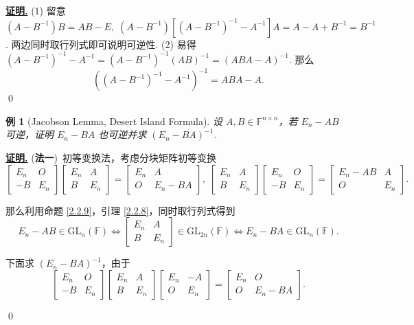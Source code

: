 \documentclass[10pt,openany]{article}
\theoremstyle{thmstyle} %
\theoremstyle{defstyle} %
\theoremstyle{prostyle} %
\theoremstyle{exastyle}
\newtheorem{example}[theorem]{例}
\theoremstyle{remstyle}
\renewenvironment{proof}[1][证明]{\par\underline{\textbf{#1.}} \;\fangsong}{\qed\par}
\newcommand{\F}{\mathbb{F}}
\newcommand{\gfn}{\text{GL}_n(\mathbb{F})}
\newcommand{\n}{^{n \times n}}
\begin{document}
\begin{proof}
	(1) 留意 \( (A-B^{-1})B=AB-E, \; (A-B^{-1})[(A - B^{-1})^{-1} - A^{-1}]A=A-A+B^{-1}=B^{-1} \). 两边同时取行列式即可说明可逆性. (2) 易得 \( (A - B^{-1})^{-1} - A^{-1}=(A - B^{-1})^{-1}(AB)^{-1}=(ABA-A)^{-1} \). 那么
	\[ \left( (A - B^{-1})^{-1} - A^{-1} \right)^{-1}=ABA-A. \]
\end{proof}

\begin{example}[Jacobson Lemma, Desert Island Formula] \label{2.5.11}
	设 \( A,B \in \F\n \)，若 \( E_n-AB \) 可逆，证明 \( E_n-BA \) 也可逆并求 \( (E_n-BA)^{-1} \).
\end{example}

\begin{proof}
	(\textbf{法一})\ 初等变换法，考虑分块矩阵初等变换
	\[ \begin{bmatrix}
		E_n & O \\
		-B & E_n
	\end{bmatrix}\begin{bmatrix}
	E_n & A \\
	B & E_n
	\end{bmatrix}=\begin{bmatrix}
	E_n & A \\
	O & E_n-BA
	\end{bmatrix}, \; \begin{bmatrix}
	E_n & A \\
	B & E_n
	\end{bmatrix}\begin{bmatrix}
	E_n & O \\
	-B & E_n
	\end{bmatrix}=\begin{bmatrix}
	E_n-AB & A \\
	O & E_n
	\end{bmatrix}. \]
	
	那么利用命题 \ref{2.2.9}，引理 \ref{2.2.8}，同时取行列式得到
	\[ E_n-AB \in \gfn \Leftrightarrow \begin{bmatrix}
		E_n & A \\
		B & E_n
	\end{bmatrix} \in \text{GL}_{2n}(\F) \Leftrightarrow E_n-BA \in \gfn. \]
	
	下面求 \( (E_n-BA)^{-1} \)，由于
	\[ \begin{bmatrix}
		E_n & O \\
		-B & E_n
	\end{bmatrix}\begin{bmatrix}
		E_n & A \\
		B & E_n
	\end{bmatrix}\begin{bmatrix}
	E_n & -A \\
	O & E_n
	\end{bmatrix}=\begin{bmatrix}
	E_n & O \\
	O & E_n-BA
	\end{bmatrix}. \]
	

\end{proof}
\end{document}
